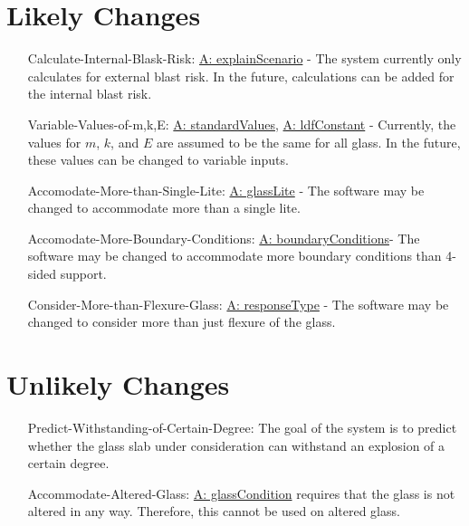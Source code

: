 \documentclass[12pt]{article}
\begin{document}
\section{Likely Changes}
\label{Sec:LCs}
\begin{itemize}
\item[Calculate-Internal-Blask-Risk:\phantomsection\label{calcInternalBlastRisk}]\hyperref[assumpES]{A: explainScenario} - The system currently only calculates for external blast risk. In the future, calculations can be added for the internal blast risk.
\item[Variable-Values-of-m,k,E:\phantomsection\label{varValsOfmkE}]\hyperref[assumpSV]{A: standardValues}, \hyperref[assumpLDFC]{A: ldfConstant} - Currently, the values for $m$, $k$, and $E$ are assumed to be the same for all glass. In the future, these values can be changed to variable inputs.
\item[Accomodate-More-than-Single-Lite:\phantomsection\label{accMoreThanSingleLite}]\hyperref[assumpGL]{A: glassLite} - The software may be changed to accommodate more than a single lite.
\item[Accomodate-More-Boundary-Conditions:\phantomsection\label{accMoreBoundaryConditions}]\hyperref[assumpBC]{A: boundaryConditions}- The software may be changed to accommodate more boundary conditions than 4-sided support.
\item[Consider-More-than-Flexure-Glass:\phantomsection\label{considerMoreThanFlexGlass}]\hyperref[assumpRT]{A: responseType} - The software may be changed to consider more than just flexure of the glass.
\end{itemize}
\section{Unlikely Changes}
\label{Sec:UCs}
\begin{itemize}
\item[Predict-Withstanding-of-Certain-Degree:\phantomsection\label{predictWithstandOfCertDeg}]The goal of the system is to predict whether the glass slab under consideration can withstand an explosion of a certain degree.
\item[Accommodate-Altered-Glass:\phantomsection\label{accAlteredGlass}]\hyperref[assumpGC]{A: glassCondition} requires that the glass is not altered in any way. Therefore, this cannot be used on altered glass.
\end{itemize}
\end{document}
